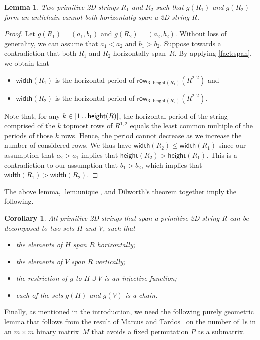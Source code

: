 \documentclass[11pt,letterpaper]{article}
\newcommand{\width}{\textsf{width}}
\newcommand{\height}{\textsf{height}}
\def\dd{\mathinner{.\,.}}
\newcommand{\hspan}[2]{\textsf{row}_{3\cdot \height(#1)}(#2^{2,2})}
\newtheorem{lemma}[theorem]{Lemma}
\newtheorem{corollary}[theorem]{Corollary}
\begin{document}
\begin{lemma}\label{lem:onechain}
Two primitive 2D strings $R_1$ and $R_2$ such that
$g(R_1)$ and
$g(R_2)$
form an antichain cannot both horizontally span a 2D string $R$.
\end{lemma}
\begin{proof}
Let $g(R_1)=(a_1,b_1)$ and $g(R_2)=(a_2,b_2)$.
Without loss of generality, we can assume that
$a_1 < a_2$ and
$b_1 > b_2$.
Suppose towards a contradiction that both $R_1$ and $R_2$ horizontally span~$R$.
By applying \cref{fact:span}, we obtain that
\begin{itemize}
\item $\width(R_1)$ is the horizontal period of $\hspan{R_1}{R}$ and
\item $\width(R_2)$ is the horizontal period of $\hspan{R_2}{R}$.
\end{itemize}
Note that, for any $k \in [1 \dd \height(R)]$, the horizontal period of the string comprised of the $k$ topmost rows of $R^{1,2}$ equals the least common multiple of the periods of those $k$ rows.
Hence, the period cannot decrease as we increase the number of considered rows.
We thus have $\width(R_2) \leq \width(R_1)$ since our assumption that $a_2>a_1$ implies that $\height(R_2) > \height(R_1)$.
This is a contradiction to our assumption that $b_1>b_2$, which implies that $\width(R_1)>\width(R_2)$.
\end{proof}

The above lemma, \cref{lem:unique}, and Dilworth's theorem together imply the following.

\begin{corollary}\label{cor:twochains}
All primitive 2D strings that span a primitive 2D string $R$ can be decomposed to two sets $H$ and $V$, such that
\begin{itemize}
\item the elements of $H$ span $R$ horizontally;
\item the elements of $V$ span $R$ vertically;
\item the restriction of $g$ to $H \cup V$ is an injective function;
\item each of the sets $g(H)$ and $g(V)$ is a chain.
\end{itemize}
\end{corollary}

Finally, as mentioned in the introduction, we need the following purely geometric lemma that follows from the result of
Marcus and Tardos~\cite{DBLP:journals/jct/MarcusT04} on the number of 1s in an $m\times m$ binary matrix~$M$ that
avoids a fixed permutation $P$ as a submatrix.
\end{document}
